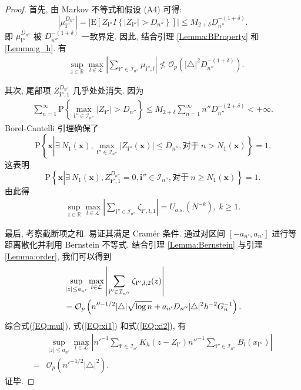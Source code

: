 \documentclass[a4paper,openay,14pt]{ctexbook}
\numberwithin{equation}{section}
\numberwithin{lem}{section}
\begin{document}
\begin{proof}
    首先, 由 Markov 不等式和假设 (A4) 可得:
    $$\left\vert \mu_{\mathbf{i}''}^{D_{n''}}\right \vert=\left \vert\mathrm{E}\left[Z_{\mathbf{i}''}I\left\{\vert Z_{\mathbf{i}''}\vert>D_{n''}\right\}\right]\right\vert \leq M_{2+\delta}D_{n''}^{-(1+\delta)}.$$
    即 $\mu_{\mathbf{i}''}^{D_{n''}}$ 被 $D_{n''}^{-(1+\delta)}$ 一致界定. 因此, 结合引理 \ref{Lemma:BProperty} 和 \ref{Lemma:g_h}. 有
    \begin{align}\label{EQ:mul}
        &\sup_{z\in\mathbb{R}}\max_{l\in\mathcal{L}}\left\vert \sum_{\mathbf{i}''\in\mathcal{I}_{n''}}\mu_{\mathbf{i}'',l}\right\vert\not \leq \mathcal{O}_p\left(\left \vert\triangle\right \vert^2D_{n''}^{-(1+\delta)}\right).
    \end{align}

    其次, 尾部项 $Z_{\mathbf{i}'',1}^{D_{n''}}$ 几乎处处消失. 因为
    \begin{align*}
    \sum_{n=1}^{\infty} \mathrm{P}\left\{\max_{\mathbf{i}''\in\mathcal{I}_{n''}}\vert Z_{\mathbf{i}''}\vert > D_{n''}\right\}\leq M_{2+\delta}\sum_{n=1}^{\infty}n''D_{n''}^{-(2+\delta)}<+\infty.
    \end{align*}
    Borel-Cantelli 引理确保了
    $$\mathrm{P}\left\{\boldsymbol{x}\left|\exists\: N_{1}\left(\boldsymbol{x}\right),\max\limits_{\mathbf{i}''\in\mathcal{I}_{n''}}\left|Z_{\mathbf{i}''}\left(\boldsymbol{\mathbf{x}}\right)\right|\leq D_{n''}, \text{对于}\:n>N_{1}\left(\boldsymbol{x}\right)\right\}=1.\right.$$
    这表明
    $$\mathrm{P}\left\{\boldsymbol{x}\left|\exists\:N_{1}\left(\boldsymbol{x}\right),Z_{\mathbf{i}'',1}^{D_{n''}}=0, \mathbf{i}''\in\mathcal{I}_{n''}, \text{对于} \:n\geq N_{1}\left(\boldsymbol{x}\right)\right\}=1.\right.$$
    由此得
    \begin{align}\label{EQ:xi1}
    \sup_{z\in\mathbb{R}}\max_{l\in\mathcal{L}}\left\vert\sum_{\mathbf{i}''\in\mathcal{I}_{n''}}\zeta_{\mathbf{i}'',l,1}\right\vert = U_{a.s.}\left(N^{-k}\right),~k\geq 1.
    \end{align}

    最后, 考察截断项之和. 易证其满足 Cram{\'e}r 条件. 通过对区间 $[-a_{n'}, a_{n'}]$ 进行等距离散化并利用 Bernstein 不等式. 结合引理 \ref{Lemma:Bernstein} 与引理\ref{Lemma:order}, 我们可以得到
    \begin{align}\label{EQ:xi2}
        &\sup_{\vert z\vert\leq a_{n'}}\max_{l\in\mathcal{L}}\left\vert\sum_{\mathbf{i}''\in\mathcal{I}_{n''}}\zeta_{\mathbf{i}'',l,2}(z)\right\vert \notag\\
        &=\mathcal{O}_p\left(n''^{-1/2}\vert\triangle\vert\sqrt{\log{n}} + a_{n'}D_{n''}\vert\triangle\vert^{2}h^{-2}G_{n}^{-1}\right).
    \end{align}
    综合式(\ref{EQ:mul}), 式(\ref{EQ:xi1}) 和式(\ref{EQ:xi2}), 有
    \begin{align*}
        &\sup_{\vert z\vert\leq a_{n'}}\max_{l\in\mathcal{L}}\left\vert n'^{-1}\sum_{\mathbf{i}'\in\mathcal{I}_{n'}}K_h(z-Z_{\mathbf{i}'})n''^{-1}\sum_{\mathbf{i}''\in\mathcal{I}_{n''}}B_{l}\left(x_{\mathbf{i}''}\right)\right\vert \\
        =& {\scriptstyle \mathcal{O}}_p\left(n'^{-1/2}\vert\triangle\vert^2\right).
    \end{align*}
    证毕.
\end{proof}
\end{document}
